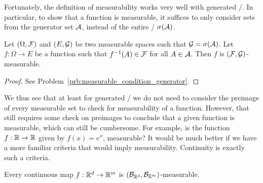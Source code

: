 Fortunately, the definition of measurability works very well with generated \sigalgs/. In particular, to show that a function is measurable, it suffices to only consider sets from the generator set $\mathcal A$, instead of the entire \sigalg/ $\sigma(\mathcal A)$.

\begin{lemma}\label{lem:measurable_condition_generator}
Let $(\Omega, \mathcal F)$ and $(E, \mathcal G)$ be two measurable spaces such that $\mathcal G = \sigma(\mathcal A)$. Let $f: \Omega \to E$ be a function such that $f^{-1}(A) \in \mathcal F$ for all $A \in \mathcal A$. Then $f$ is $(\mathcal F, \mathcal G)$-measurable.
\end{lemma}

\begin{proof}
See Problem~\ref{prb:measurable_condition_generator}.
\end{proof}

We thus see that at least for generated \sigalgs/ we do not need to consider the preimage of every measurable set to check for measurability of a function. However, that still requires some check on preimages to conclude that a given function is measurable, which can still be cumbersome. For example, is the function $f : \mathbb R \to \mathbb R$ given by $f(x) = e^x$, measurable? It would be much better if we have a more familiar criteria that would imply measurability. Continuity is exactly such a criteria. 

\begin{proposition}
Every continuous map $f : \mathbb R^d \to \mathbb R^m$ is $(\mathcal B_{\mathbb R^d}, \mathcal B_{\mathbb R^m})$-measurable.
\end{proposition}

